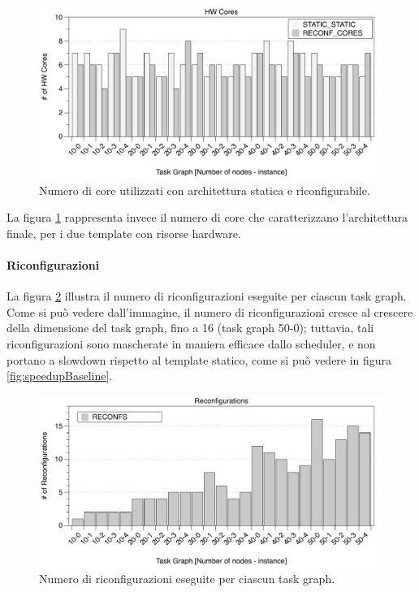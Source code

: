 \begin{figure}[t]
 \begin{center}
  \includegraphics[width=\textwidth]{./capitoli/figure/cap6/FPL_HWcores.pdf}
  \caption{Numero di core utilizzati con architettura statica e riconfigurabile.}
  \label{fig:coreUtilizzati}
 \end{center}
\end{figure}

La figura \ref{fig:coreUtilizzati} rappresenta invece il numero di core che caratterizzano
l'architettura finale, per i due template con risorse hardware.

\paragraph{Riconfigurazioni}
La figura \ref{fig:numeroRiconfigurazioni} illustra il numero di riconfigurazioni
eseguite per ciascun task graph. Come si pu\`o vedere dall'immagine, il numero
di riconfigurazioni cresce al crescere della dimensione del task graph,
fino a 16 (task graph 50-0); tuttavia, tali riconfigurazioni sono mascherate in maniera
efficace dallo scheduler, e non portano a slowdown rispetto al template statico,
come si pu\`o vedere in figura \ref{fig:speedupBaseline}.

\begin{figure}[t]
 \begin{center}
  \includegraphics[width=\textwidth]{./capitoli/figure/cap6/FPL_Reconfs.pdf}
  \caption{Numero di riconfigurazioni eseguite per ciascun task graph.}
  \label{fig:numeroRiconfigurazioni}
 \end{center}
\end{figure}



